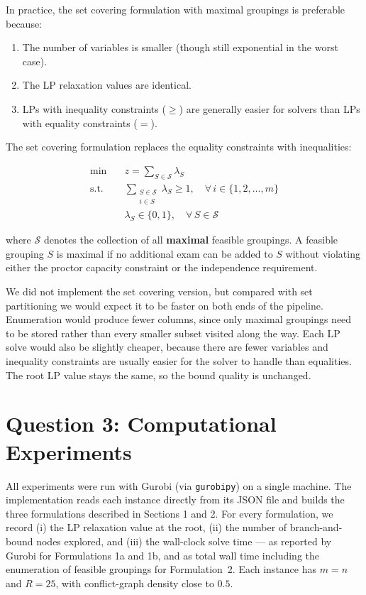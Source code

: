 \documentclass{article}
\begin{document}
In practice, the set covering formulation with maximal groupings is preferable because:
\begin{enumerate}
    \item The number of variables is smaller (though still exponential in the worst case).
    \item The LP relaxation values are identical.
    \item LPs with inequality constraints ($\geq$) are generally easier for solvers
          than LPs with equality constraints ($=$).
\end{enumerate}

The set covering formulation replaces the equality constraints with inequalities:

\begin{align}
\min \quad & z = \sum_{S \in \mathcal{S}} \lambda_S \\
\text{s.t.} \quad & \sum_{\substack{S \in \mathcal{S} \\ i \in S}} \lambda_S \geq 1, \quad \forall\, i \in \{1, 2, \dots, m\} \\
& \lambda_S \in \{0,1\}, \quad \forall\, S \in \mathcal{S}
\end{align}

where $\mathcal{S}$ denotes the collection of all \textbf{maximal} feasible groupings. A feasible grouping $S$ is maximal if no additional exam can be added to $S$ without violating either the proctor capacity constraint or the independence requirement.

We did not implement the set covering version, but compared with set partitioning we
would expect it to be faster on both ends of the pipeline. Enumeration would produce
fewer columns, since only maximal groupings need to be stored rather than every
smaller subset visited along the way. Each LP solve would also be slightly cheaper,
because there are fewer variables and inequality constraints are usually easier for
the solver to handle than equalities. The root LP value stays the same, so the bound
quality is unchanged.

\section{Question 3: Computational Experiments}

All experiments were run with Gurobi (via \texttt{gurobipy}) on a single machine. The
implementation reads each instance directly from its JSON file and builds the three
formulations described in Sections 1 and 2. For every formulation, we record (i) the LP
relaxation value at the root, (ii) the number of branch-and-bound nodes explored, and
(iii) the wall-clock solve time --- as reported by Gurobi for Formulations 1a and 1b,
and as total wall time including the enumeration of feasible groupings for
Formulation~2. Each instance has $m = n$ and $R = 25$, with conflict-graph density
close to $0.5$.
\end{document}

